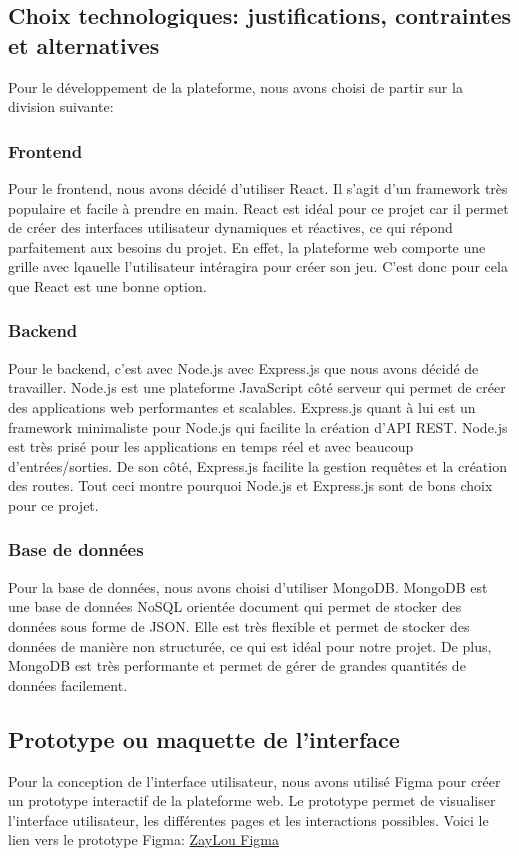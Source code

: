 \documentclass[12pt]{article}        %
\begin{document}
\subsection{Choix technologiques: justifications, contraintes 
et alternatives}
\label{subsec:Choix technologiques}
Pour le développement de la plateforme, nous avons choisi de partir 
sur la division suivante:

\subsubsection{Frontend}
\label{subsubsec:Frontend}
Pour le frontend, nous avons décidé d'utiliser React. Il s'agit 
d'un framework très populaire et facile à prendre en main. 
React est idéal pour ce projet car il permet de créer des interfaces 
utilisateur dynamiques et réactives, ce qui répond parfaitement
aux besoins du projet. En effet, la plateforme web comporte une
grille avec lqauelle l'utilisateur intéragira pour créer son jeu.
C'est donc pour cela que React est une bonne option.

\subsubsection{Backend}
\label{subsubsec:Backend}
Pour le backend, c'est avec Node.js avec Express.js que nous avons
décidé de travailler. Node.js est une plateforme JavaScript côté serveur 
qui permet de créer des applications web performantes et scalables.
Express.js quant à lui est un framework minimaliste pour Node.js qui 
facilite la création d'API REST.
Node.js est très prisé pour les applications en temps réel et avec
beaucoup d'entrées/sorties. De son côté, Express.js facilite la gestion
requêtes et la création des routes. Tout ceci montre pourquoi Node.js et 
Express.js sont de bons choix pour ce projet.

\subsubsection{Base de données}
\label{subsubsec:Base de données}
Pour la base de données, nous avons choisi d'utiliser MongoDB.
MongoDB est une base de données NoSQL orientée document qui permet 
de stocker des données sous forme de JSON. Elle est très flexible et 
permet de stocker des données de manière non structurée, ce qui est idéal 
pour notre projet. De plus, MongoDB est très performante et permet de 
gérer de grandes quantités de données facilement.

\subsection{Prototype ou maquette de l’interface}
\label{subsec:Prototype}
Pour la conception de l'interface utilisateur, nous avons utilisé Figma 
pour créer un prototype interactif de la plateforme web. Le prototype 
permet de visualiser l'interface utilisateur, les différentes pages et 
les interactions possibles. Voici le lien vers le prototype 
Figma: \href{https://www.figma.com/design/eKXFDHbDRlhK4KngvE7KGb/
ZayLou_Games?node-id=0-1&t=n9lvoJhYaFOCaRAi-1}{ZayLou Figma}
\end{document}
